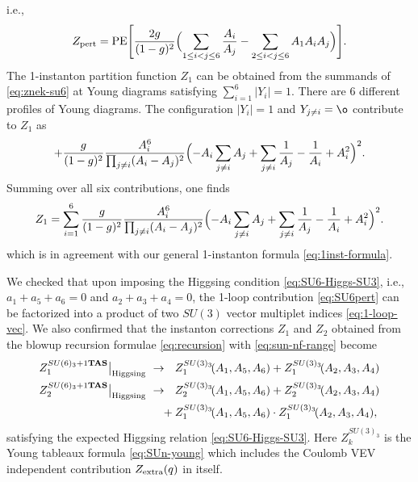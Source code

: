 \documentclass[letterpaper, 11pt]{article}
\begin{document}
{i.e., 
\begin{align}
  \label{eq:SU6pert}
  Z_{\rm pert}  = \text{PE} \Biggl[ 
    \frac{2g}{(1-g)^2} 
    \Bigl(\sum_{1\leq i<j \leq 6}  \frac{A_i}{A_j} 
    - \sum_{2\leq i<j \leq 6} A_1 A_i  A_j %
    \Bigr)
    \Biggr].
\end{align}
The 1-instanton partition function $Z_1$ can be obtained from the summands of \eqref{eq:znek-su6} at Young diagrams satisfying $\sum_{i=1}^6 |Y_i|=1$. There are 6 different profiles of Young diagrams. The configuration $|Y_i| = 1$ and %
$Y_{j\neq i} = \o$ contribute to $Z_{1}$ as
\begin{align}
  + \frac{g}{(1-g)^2} \frac{A_i^6}{\prod_{j \neq i} (A_i - A_j)^2} 
  \Bigl(-A_i \sum_{j\neq i} A_j +  \sum_{j\neq i}\frac{1}{A_j}  - \frac{1}{A_i} + A_i^2
 \Bigr)^2. 
\end{align}
Summing over all six contributions, one finds
\begin{align}
  Z_1 = \sum_{i=1}^6 \frac{g}{(1-g)^2} \frac{A_i^6}{\prod_{j \neq i} (A_i - A_j)^2} 
  \Bigl(-A_i \sum_{j\neq i} A_j +  \sum_{j\neq i}\frac{1}{A_j}  - \frac{1}{A_i} + A_i^2
 \Bigr)^2. 
\end{align}
which is in agreement with our general 1-instanton formula \eqref{eq:1inst-formula}.

We checked that upon imposing the Higgsing condition \eqref{eq:SU6-Higgs-SU3}, i.e., $a_1 + a_5 + a_6 = 0$ and $a_2 + a_3 + a_4 = 0$, the 1-loop contribution \eqref{eq:SU6pert} can be factorized into a product of two $SU(3)$ vector multiplet indices \eqref{eq:1-loop-vec}. We also confirmed that the instanton corrections $Z_1$ and $Z_2$ obtained from the blowup recursion formulae \eqref{eq:recursion} with \eqref{eq:sun-nf-range} become
\begin{align}
  \begin{split}
  Z_1^{SU(6)_{3}+1{\bf TAS}}\big|_{\rm Higgsing}~&\rightarrow ~~ Z_1^{SU(3)_{3}}
  \!(A_1, A_5,A_6)+Z_1^{SU(3)_{3}}\!(A_2, A_3,A_4)\\
  Z_2^{SU(6)_{3}+1{\bf TAS}}\big|_{\rm Higgsing}~&\rightarrow ~~ Z_2^{SU(3)_{3}}\!(A_1, A_5,A_6)+Z_2^{SU(3)_{3}}\!(A_2, A_3,A_4) \\
  &\quad+ Z_1^{SU(3)_{3}}\!(A_1, A_5,A_6)\cdot Z_1^{SU(3)_{3}}\!(A_2, A_3,A_4),
  \end{split}
\end{align}
satisfying the expected Higgsing relation \eqref{eq:SU6-Higgs-SU3}. Here $Z_k^{SU(3)_{3}}$ is the Young tableaux formula \eqref{eq:SUn-young} which includes the Coulomb VEV independent contribution $Z_{\rm extra}(q)$ in itself.




}
\end{document}
